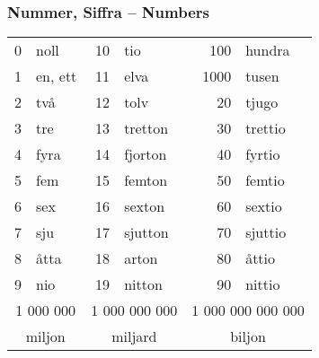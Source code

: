 \documentclass[14pt]{refcard} %
\begin{document}
\pagebreak

\subsubsection{Nummer, Siffra -- Numbers}
\vspace{-1ex}
\begin{tabular}{rl rl rl}
0 & noll    &  10 & tio             &  100 & hundra           \\
1 & en, ett &  11 & elva            & 1000 & tusen            \\
2 & två     &  12 & tolv            &   20 & tjugo            \\
3 & tre     &  13 & tretton         &   30 & trettio          \\
4 & fyra    &  14 & fjorton         &   40 & fyrtio           \\
5 & fem     &  15 & femton          &   50 & femtio           \\
6 & sex     &  16 & sexton          &   60 & sextio           \\
7 & sju     &  17 & sjutton         &   70 & sjuttio          \\
8 & åtta    &  18 & arton           &   80 & åttio            \\
9 & nio     &  19 & nitton          &   90 & nittio           \\
\multicolumn{2}{c}{\small 1 000 000} &
\multicolumn{2}{c}{\footnotesize 1 000 000 000} &
\multicolumn{2}{c}{\scriptsize 1 000 000 000 000} \\[-.66ex]
\multicolumn{2}{c}{miljon} &
\multicolumn{2}{c}{miljard} &
\multicolumn{2}{c}{biljon} \\
\end{tabular}
\end{document}
